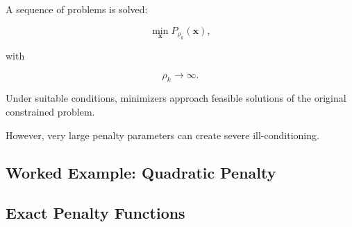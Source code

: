A sequence of problems is solved:

\[
\boxed{
\min_{\mathbf{x}}
P_{\rho_k}(\mathbf{x}),
}
\]

with

\[
\boxed{
\rho_k\to\infty.
}
\]

Under suitable conditions, minimizers approach feasible solutions of the
original constrained problem.

However, very large penalty parameters can create severe ill-conditioning.

\subsection{Worked Example: Quadratic Penalty}
\label{subsec:worked-quadratic-penalty}


\subsection{Exact Penalty Functions}
\label{subsec:exact-penalty-functions}


